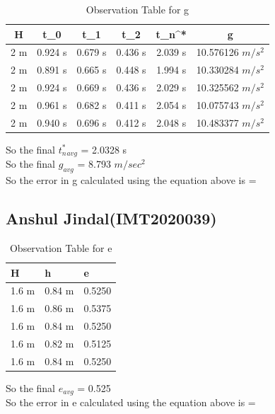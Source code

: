 \documentclass[11pt]{scrartcl} %
\begin{document}
\begin{table}[h]
\centering
\begin{tabular}{||c c c c c c||} 
\toprule
 \hline
 H & t_0 & t_1 & t_2 & t_n^* & g \\ [0.5ex] 
 \midrule
 \hline\hline
 2 m & 0.924 s & 0.679 s  & 0.436 s & 2.039 s & 10.576126 $m/s^2$  \\ 
 \hline
 2 m & 0.891 s & 0.665 s & 0.448 s & 1.994 s & 10.330284 $m/s^2$  \\
 \hline
 2 m & 0.924 s & 0.669 s & 0.436 s & 2.029 s  & 10.325562 $m/s^2$   \\
 \hline
 2 m & 0.961 s & 0.682 s & 0.411 s & 2.054 s  &10.075743 $m/s^2$   \\
 \hline
 2 m & 0.940 s & 0.696 s & 0.412 s & 2.048 s  & 10.483377 $m/s^2$  \\ [1ex]
 \bottomrule
 \hline
\end{tabular}
\caption{Observation Table for g}
\end{table}
So the final $t_n^*_{avg}$ = 2.0328 s\\
So the final $g_{avg}$ = 8.793 $m/sec^2$\\
So the error in g calculated using the equation above is =
\newpage
\subsection{Anshul Jindal(IMT2020039)}

\begin{table}[h] %
	\centering %
	\begin{tabular}{l l l}
		\toprule
		\textbf{H} & \textbf{h} & \textbf{e} \\
		\midrule
		1.6 m & 0.84 m & 0.5250\\
        1.6 m & 0.86 m & 0.5375\\
        1.6 m & 0.84 m & 0.5250\\
        1.6 m & 0.82 m & 0.5125 \\
        1.6 m & 0.84 m & 0.5250 \\
		\bottomrule
	\end{tabular}
	\caption{Observation Table for e}
\end{table}
So the final $e_{avg}$ = 0.525\\
So the error in e calculated using the equation above is =
\end{document}
